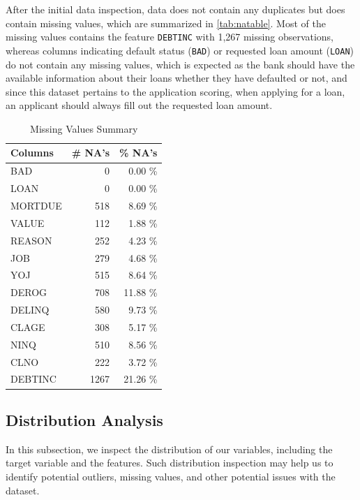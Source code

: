     After the initial data inspection, data does not contain any duplicates but does contain missing values, which are summarized in \autoref{tab:natable}.
    Most of the missing values contains the feature \texttt{DEBTINC} with 1,267 missing observations, whereas columns indicating default status (\texttt{BAD}) or requested loan amount (\texttt{LOAN}) do not contain any missing values, which is expected as the bank should have the available information about their loans whether they have defaulted or not, and since this dataset pertains to the application scoring, when applying for a loan, an applicant should always fill out the requested loan amount.

    \begin{table}[H]
        \small
        \setlength{\tabcolsep}{8pt}
        \renewcommand{\arraystretch}{1.3}
        \centering
            \caption[Missing Values Summary]{Missing Values Summary}\label{tab:natable}
        \begin{tabular}{l r r}
        \toprule
        \textbf{Columns} & \textbf{\# NA's} & \textbf{\% NA's}\\
        \midrule
        \hline
        BAD & 0 & 0.00 \% \\
    LOAN & 0 & 0.00 \% \\
    MORTDUE & 518 & 8.69 \% \\
    VALUE & 112 & 1.88 \% \\
    REASON & 252 & 4.23 \% \\
    JOB & 279 & 4.68 \% \\
    YOJ & 515 & 8.64 \% \\
    DEROG & 708 & 11.88 \% \\
    DELINQ & 580 & 9.73 \% \\
    CLAGE & 308 & 5.17 \% \\
    NINQ & 510 & 8.56 \% \\
    CLNO & 222 & 3.72 \% \\
    DEBTINC & 1267 & 21.26 \% \\
    \hline
        \bottomrule
        \end{tabular}
        \vspace{0.35em}

        \vspace{-1em}
    \end{table}


    \subsection{Distribution Analysis}
    In this subsection, we inspect the distribution of our variables, including the target variable and the features.
    Such distribution inspection may help us to identify potential outliers, missing values, and other potential issues with the dataset.

